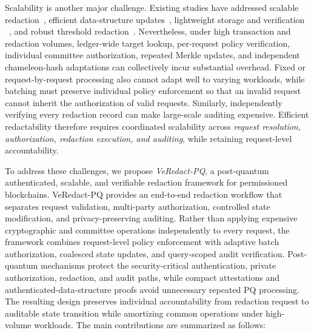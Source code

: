 \documentclass[lettersize,journal]{IEEEtran}
\begin{document}
Scalability is another major challenge. Existing studies have addressed
scalable redaction~\cite{ref14,ref21,ref26}, efficient data-structure
updates~\cite{ref23}, lightweight storage and verification
~\cite{ref20}, and robust threshold redaction~\cite{ref27}.
Nevertheless, under high transaction and redaction volumes,
ledger-wide target lookup, per-request policy verification, individual
committee authorization, repeated Merkle updates, and independent
chameleon-hash adaptations can collectively incur substantial
overhead. Fixed or request-by-request processing also cannot adapt well
to varying workloads, while batching must preserve individual policy
enforcement so that an invalid request cannot inherit the authorization
of valid requests. Similarly, independently verifying every redaction
record can make large-scale auditing expensive. Efficient redactability
therefore requires coordinated scalability across \emph{request
resolution, authorization, redaction execution, and auditing}, while
retaining request-level accountability.

To address these challenges, we propose \emph{VeRedact-PQ}, a
post-quantum authenticated, scalable, and verifiable redaction
framework for permissioned blockchains. VeRedact-PQ provides an
end-to-end redaction workflow that separates request validation,
multi-party authorization, controlled state modification, and
privacy-preserving auditing. Rather than applying expensive
cryptographic and committee operations independently to every request,
the framework combines request-level policy enforcement with adaptive
batch authorization, coalesced state updates, and query-scoped audit
verification. Post-quantum mechanisms protect the security-critical
authentication, private authorization, redaction, and audit paths,
while compact attestations and authenticated-data-structure proofs
avoid unnecessary repeated PQ processing. The resulting design
preserves individual accountability from redaction request to
auditable state transition while amortizing common operations under
high-volume workloads.
The main contributions are summarized as follows:
\end{document}
